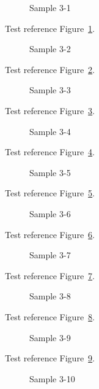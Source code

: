 \begin{figure}[tbhp]
\caption{Sample 3-1}
\label{fig:sample-3-1}
\end{figure}

Test reference Figure~\ref{fig:sample-3-1}.

\begin{figure}[tbhp]
\caption{Sample 3-2}
\label{fig:sample-3-2}
\end{figure}

Test reference Figure~\ref{fig:sample-3-2}.

\begin{figure}[tbhp]
\caption{Sample 3-3}
\label{fig:sample-3-3}
\end{figure}

Test reference Figure~\ref{fig:sample-3-3}.

\begin{figure}[tbhp]
\caption{Sample 3-4}
\label{fig:sample-3-4}
\end{figure}

Test reference Figure~\ref{fig:sample-3-4}.

\begin{figure}[tbhp]
\caption{Sample 3-5}
\label{fig:sample-3-5}
\end{figure}

Test reference Figure~\ref{fig:sample-3-5}.

\begin{figure}[tbhp]
\caption{Sample 3-6}
\label{fig:sample-3-6}
\end{figure}

Test reference Figure~\ref{fig:sample-3-6}.

\begin{figure}[tbhp]
\caption{Sample 3-7}
\label{fig:sample-3-7}
\end{figure}

Test reference Figure~\ref{fig:sample-3-7}.

\begin{figure}[tbhp]
\caption{Sample 3-8}
\label{fig:sample-3-8}
\end{figure}

Test reference Figure~\ref{fig:sample-3-8}.

\begin{figure}[tbhp]
\caption{Sample 3-9}
\label{fig:sample-3-9}
\end{figure}

Test reference Figure~\ref{fig:sample-3-9}.

\begin{figure}[tbhp]
\caption{Sample 3-10}
\label{fig:sample-3-10}
\end{figure}

